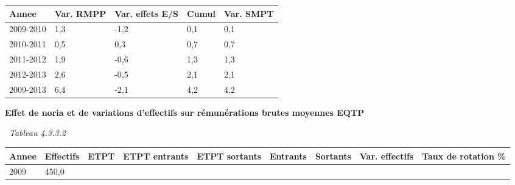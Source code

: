 \begin{longtable}[]{@{}lllll@{}}
\toprule
Annee & Var. RMPP & Var. effets E/S & Cumul & Var. SMPT\tabularnewline
\midrule
\endhead
2009-2010 & 1,3 & -1,2 & 0,1 & 0,1\tabularnewline
2010-2011 & 0,5 & 0,3 & 0,7 & 0,7\tabularnewline
2011-2012 & 1,9 & -0,6 & 1,3 & 1,3\tabularnewline
2012-2013 & 2,6 & -0,5 & 2,1 & 2,1\tabularnewline
2009-2013 & 6,4 & -2,1 & 4,2 & 4,2\tabularnewline
\bottomrule
\end{longtable}

\textbf{Effet de noria et de variations d'effectifs sur rémunérations
brutes moyennes EQTP}

~\emph{Tableau 4.3.3.2}

\begin{longtable}[]{@{}lllllllll@{}}
\toprule
\begin{minipage}[b]{0.05\columnwidth}\raggedright
Annee\strut
\end{minipage} & \begin{minipage}[b]{0.08\columnwidth}\raggedright
Effectifs\strut
\end{minipage} & \begin{minipage}[b]{0.05\columnwidth}\raggedright
ETPT\strut
\end{minipage} & \begin{minipage}[b]{0.10\columnwidth}\raggedright
ETPT entrants\strut
\end{minipage} & \begin{minipage}[b]{0.10\columnwidth}\raggedright
ETPT sortants\strut
\end{minipage} & \begin{minipage}[b]{0.07\columnwidth}\raggedright
Entrants\strut
\end{minipage} & \begin{minipage}[b]{0.07\columnwidth}\raggedright
Sortants\strut
\end{minipage} & \begin{minipage}[b]{0.11\columnwidth}\raggedright
Var. effectifs\strut
\end{minipage} & \begin{minipage}[b]{0.14\columnwidth}\raggedright
Taux de rotation \%\strut
\end{minipage}\tabularnewline
\midrule
\endhead
\begin{minipage}[t]{0.05\columnwidth}\raggedright
2009\strut
\end{minipage} & \begin{minipage}[t]{0.08\columnwidth}\raggedright
450,0\strut
\end{minipage} & \begin{minipage}[t]{0.05\columnwidth}\raggedright

\end{minipage}
\end{longtable}
